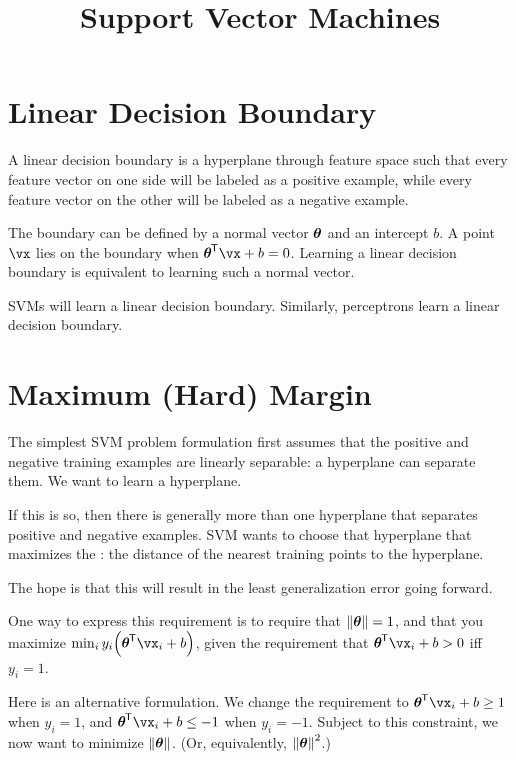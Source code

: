\documentclass[11pt, oneside]{amsart}
\begin{document}
\title{Support Vector Machines}
\maketitle

\section{Linear Decision Boundary}

A linear decision boundary is a hyperplane through feature space such
that every feature vector on one side will be labeled as a positive
example, while every feature vector on the other will be labeled as a
negative example.

The boundary can be defined by a normal vector $\bm{\mathrm{\theta}}$ and an
intercept $b$. A point $\vx$ lies on the boundary when $\vtheta\tran \vx
+ b = 0$. Learning a linear decision boundary is equivalent to learning
such a normal vector.

SVMs will learn a linear decision boundary. Similarly, perceptrons learn
a linear decision boundary.

\section{Maximum (Hard) Margin}

The simplest SVM problem formulation first assumes that the positive and
negative training examples are linearly separable: a hyperplane can
separate them. We want to learn a hyperplane.

If this is so, then there is generally more than one hyperplane that
separates positive and negative examples. SVM wants to choose that
hyperplane that maximizes the : the distance of the
nearest training points to the hyperplane.

The hope is that this will result in the least generalization error
going forward.

One way to express this requirement is to require that $\left\Vert \bm{\mathrm{\theta}} \right\Vert =
1$, and that you maximize $\min_i y_i \parens{\vtheta\tran \vx_i + b}$,
given the requirement that $\vtheta\tran \vx_i + b > 0$ iff $y_i = 1$.

Here is an alternative formulation. We change the requirement to
$\vtheta\tran \vx_i + b \geq 1$ when $y_i = 1$, and $\vtheta\tran \vx_i
+ b \leq -1$ when $y_i = -1$. Subject to this constraint, we now want to
minimize $\left\Vert \bm{\mathrm{\theta}} \right\Vert$. (Or, equivalently, $\left\Vert \bm{\mathrm{\theta}} \right\Vert^2$.)
\end{document}

